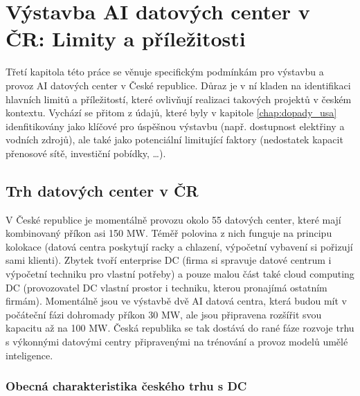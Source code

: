 
\chapter{Výstavba AI datových center v ČR: Limity a příležitosti}
\label{chap:cz}

Třetí kapitola této práce se věnuje specifickým podmínkám pro výstavbu a provoz AI datových center v České republice. Důraz je v ní kladen na identifikaci hlavních limitů a příležitostí, které ovlivňují realizaci takových projektů v českém kontextu. Vychází se přitom z údajů, které byly v kapitole \ref{chap:dopady_usa} idenfitikovány jako klíčové pro úspěšnou výstavbu (např. dostupnost elektřiny a vodních zdrojů), ale také jako potenciální limitující faktory (nedostatek kapacit přenosové sítě, investiční pobídky, \dots).

\section{Trh datových center v ČR}
\label{sec:cz_trh}


V České republice je momentálně provozu okolo 55 datových center, které mají kombinovaný příkon asi 150 MW. Téměř polovina z nich funguje na principu kolokace (datová centra poskytují racky a chlazení, výpočetní vybavení si pořizují sami klienti). Zbytek tvoří enterprise DC (firma si spravuje datové centrum i výpočetní techniku pro vlastní potřeby) a pouze malou část také cloud computing DC (provozovatel DC vlastní prostor i techniku, kterou pronajímá ostatním firmám). Momentálně jsou ve výstavbě dvě AI datová centra, která budou mít v počáteční fázi dohromady příkon 30 MW, ale jsou připravena rozšířit svou kapacitu až na 100 MW. Česká republika se tak dostává do rané fáze rozvoje trhu s výkonnými datovými centry připravenými na trénování a provoz modelů umělé inteligence.

\subsection{Obecná charakteristika českého trhu s DC}
\label{subsec:cz_trh_prehled}

